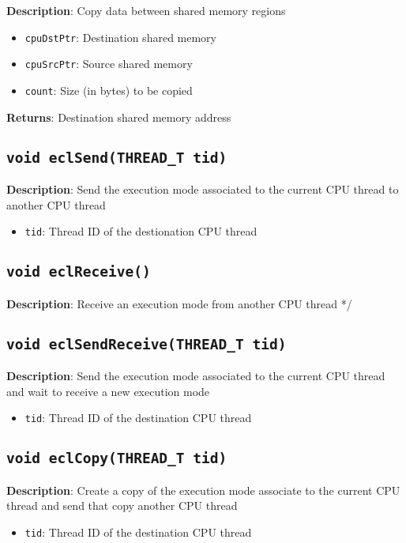 \textbf{Description}: Copy data between shared memory regions
\begin{itemize}
  \item \texttt{cpuDstPtr}: Destination shared memory
  \item \texttt{cpuSrcPtr}: Source shared memory
  \item \texttt{count}: Size (in bytes) to be copied
\end{itemize}
\textbf{Returns}: Destination shared memory address

\subsection{\texttt{void eclSend(THREAD\_T tid)}}

\textbf{Description}: Send the execution mode associated to the current CPU thread to another CPU thread
\begin{itemize}
  \item \texttt{tid}: Thread ID of the destionation CPU thread
\end{itemize}

\subsection{\texttt{void eclReceive()}}

\textbf{Description}: Receive an execution mode from another CPU thread */

\subsection{\texttt{void eclSendReceive(THREAD\_T tid)}}

\textbf{Description}: Send the execution mode associated to the current CPU thread and wait to receive a new execution mode
\begin{itemize}
  \item \texttt{tid}: Thread ID of the destination CPU thread
\end{itemize}

\subsection{\texttt{void eclCopy(THREAD\_T tid)}}

\textbf{Description}: Create a copy of the execution mode associate to the current CPU thread and send that copy another CPU thread
\begin{itemize}
  \item \texttt{tid}: Thread ID of the destination CPU thread
\end{itemize}

